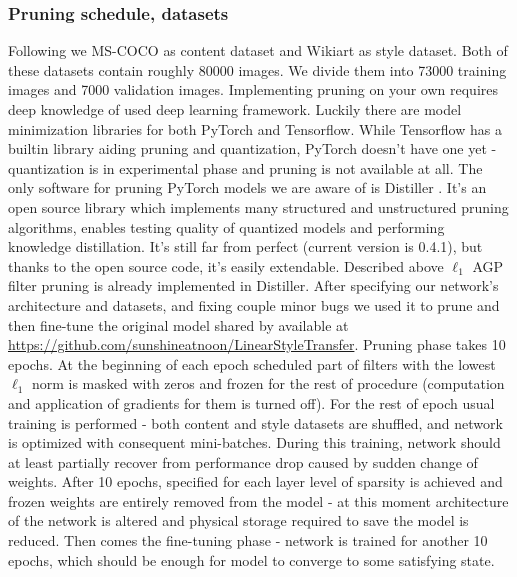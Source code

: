 \documentclass[../Main.tex]{subfiles}
\begin{document}
    \subsubsection{Pruning schedule, datasets} 
    Following \cite{Li2018} we MS-COCO \cite{mscoco} as content dataset and Wikiart \cite{wikiart}
    as style dataset. Both of these datasets contain roughly 80000 images. We divide them 
    into 73000 training images and 7000 validation images. Implementing pruning on your own
    requires deep knowledge of used deep learning framework. Luckily there are model 
    minimization libraries for both PyTorch and Tensorflow. While Tensorflow has 
    a builtin library aiding pruning and quantization, PyTorch doesn't have one yet - 
    quantization is in experimental phase and pruning is not available at all. The only 
    software for pruning PyTorch models we are aware of is Distiller \cite{distiller}.
    It's an open source library which implements many structured and unstructured
    pruning algorithms, enables testing quality of quantized models and performing
    knowledge distillation. It's still far from perfect (current version is 0.4.1), but 
    thanks to the open source code, it's easily extendable. Described above
    $\ell_1$ AGP filter pruning is already implemented in Distiller. After specifying
    our network's architecture and datasets, and fixing couple minor bugs 
    we used it to prune and then fine-tune the 
    original model shared by \cite{Li2018} available at
    \url{https://github.com/sunshineatnoon/LinearStyleTransfer}. 
    Pruning phase takes 10 epochs. At the beginning of each epoch scheduled part of filters
    with the lowest $\ell_1$ norm is masked with zeros and frozen for the rest of procedure
    (computation and application of gradients for them is turned off). For the rest of 
    epoch usual training is performed - both content and style datasets are shuffled,
    and network is optimized with consequent mini-batches. During this training,
    network should at least partially recover from performance drop caused by sudden
    change of weights. After 10 epochs, specified
    for each layer level of sparsity is achieved and frozen weights are entirely removed
    from the model - at this moment architecture of the network is altered and physical
    storage required to save the model is reduced. Then comes the fine-tuning phase - 
    network is trained for another
    10 epochs, which should be enough for model to converge to some satisfying state.
    
\end{document}
